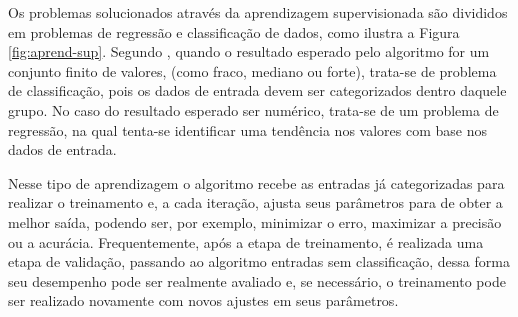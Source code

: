 \documentclass[oneside,openright,12pt]{ufsm_2015} %
\begin{document}
    \par Os problemas solucionados através da aprendizagem supervisionada são divididos em problemas de regressão e classificação de dados, como ilustra a Figura \ref{fig:aprend-sup}. Segundo \cite{book:russell:10}, quando o resultado esperado pelo algoritmo for um conjunto finito de valores, (como fraco, mediano ou forte), trata-se de problema de classificação, pois os dados de entrada devem ser categorizados dentro daquele grupo. No caso do resultado esperado ser numérico, trata-se de um problema de regressão, na qual tenta-se identificar uma tendência nos valores com base nos dados de entrada.

    \par Nesse tipo de aprendizagem o algoritmo recebe as entradas já categorizadas para realizar o treinamento e, a cada iteração, ajusta seus parâmetros para de obter a melhor saída, podendo ser, por exemplo, minimizar o erro, maximizar a precisão ou a acurácia. Frequentemente, após a etapa de treinamento, é realizada uma etapa de validação, passando ao algoritmo entradas sem classificação, dessa forma seu desempenho pode ser realmente avaliado e, se necessário, o treinamento pode ser realizado novamente com novos ajustes em seus parâmetros.
\end{document}
